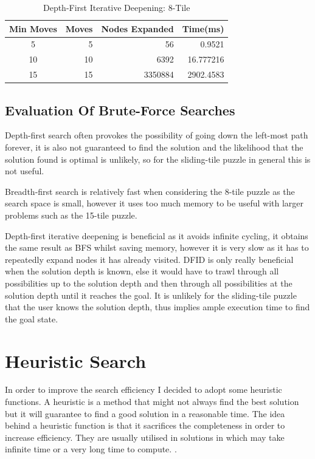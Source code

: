 \documentclass[progress]{cmpreport}
\begin{document}
\begin{table}[ht]
	\caption{Depth-First Iterative Deepening: 8-Tile}
	\begin{center}
		\begin{tabular}{crrr} \hline
			Min Moves & Moves & Nodes Expanded &Time(ms)  \\ \hline
			5  & 5 & 56 & 0.9521 \\
			10 & 10  &6392&  16.777216 \\ 
			15 & 15 & 3350884& 2902.4583  \\ \hline
		
		\end{tabular}
	\end{center}
\end{table}



\subsection{Evaluation Of Brute-Force Searches}
Depth-first search often provokes the possibility of going down the left-most path forever, it is also not guaranteed to find the solution and the likelihood that the solution found is optimal is unlikely, so for the sliding-tile puzzle in general this is not useful. 

Breadth-first search is relatively fast when considering the 8-tile puzzle as the search space is small, however it uses too much memory to be useful with larger problems such as the 15-tile puzzle. 

Depth-first iterative deepening is beneficial as it avoids infinite cycling, it obtains the same result as BFS whilst saving memory, however it is very slow as it has to repeatedly expand nodes it has already visited. DFID is only really beneficial when the solution depth is known, else it would have to trawl through all possibilities up to the solution depth and then through all possibilities at the solution depth until it reaches the goal. It is unlikely for the sliding-tile puzzle that the user knows the solution depth, thus implies ample execution time to find the goal state.


\section{Heuristic Search} \label{sec1}
In order to improve the search efficiency I decided to adopt some heuristic functions. A heuristic is a method that might not always find the best solution but it will guarantee to find a good solution in a reasonable time. The idea behind a heuristic function is that it sacrifices the completeness in order to increase efficiency. They are usually utilised in solutions in which may take infinite time or a very long time to compute. \citep{DBLP:conf/ai/2014}. 
\end{document}
